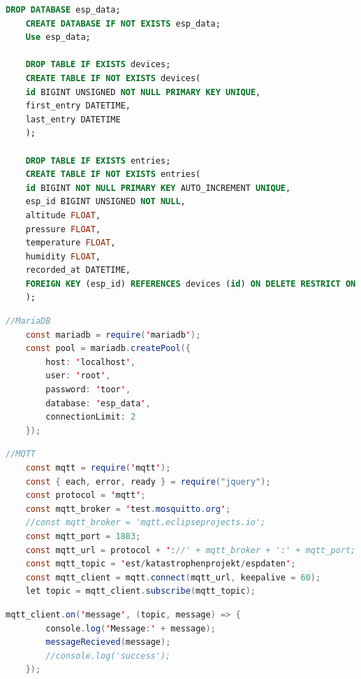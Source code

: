 \begin{lstlisting}[language=SQL, caption={Datenbankinitialisierungsscript}, label=lst:db_initialisation_script]
	DROP DATABASE esp_data;
	CREATE DATABASE IF NOT EXISTS esp_data;
	Use esp_data;
	
	DROP TABLE IF EXISTS devices;
	CREATE TABLE IF NOT EXISTS devices(
	id BIGINT UNSIGNED NOT NULL PRIMARY KEY UNIQUE,
	first_entry DATETIME,
	last_entry DATETIME
	);
	
	DROP TABLE IF EXISTS entries;
	CREATE TABLE IF NOT EXISTS entries(
	id BIGINT NOT NULL PRIMARY KEY AUTO_INCREMENT UNIQUE,
	esp_id BIGINT UNSIGNED NOT NULL,
	altitude FLOAT,
	pressure FLOAT,
	temperature FLOAT,
	humidity FLOAT,
	recorded_at DATETIME,
	FOREIGN KEY (esp_id) REFERENCES devices (id) ON DELETE RESTRICT ON UPDATE CASCADE
	);
\end{lstlisting}

\begin{lstlisting}[language=java, caption={Konfiguration der MariaDB Verbindung}, label=lst:conf_mariadb_conn]
	//MariaDB
	const mariadb = require('mariadb');
	const pool = mariadb.createPool({
		host: 'localhost',
		user: 'root',
		password: 'toor',
		database: 'esp_data',
		connectionLimit: 2
	});
\end{lstlisting}

\begin{lstlisting}[language=java, caption={Konfiguration der MQTT Verbindung}, label=lst:conf_mqtt_conn]
	//MQTT
	const mqtt = require('mqtt');
	const { each, error, ready } = require("jquery");
	const protocol = 'mqtt';
	const mqtt_broker = 'test.mosquitto.org';
	//const mqtt_broker = 'mqtt.eclipseprojects.io';
	const mqtt_port = 1883;
	const mqtt_url = protocol + '://' + mqtt_broker + ':' + mqtt_port;
	const mqtt_topic = 'est/katastrophenprojekt/espdaten';
	const mqtt_client = mqtt.connect(mqtt_url, keepalive = 60);
	let topic = mqtt_client.subscribe(mqtt_topic);
\end{lstlisting}

\begin{lstlisting}[language=java, caption={Event: MQTT Message}, label=lst:event_message]
	mqtt_client.on('message', (topic, message) => {
		console.log('Message:' + message);
		messageRecieved(message);
		//console.log('success');
	});
\end{lstlisting}

